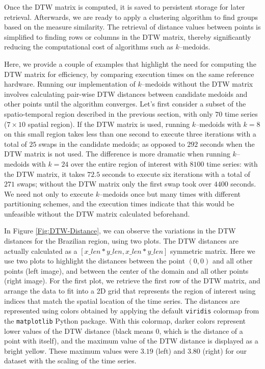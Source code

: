 Once the DTW matrix is computed, it is saved to persistent storage for later retrieval. Afterwards, we are ready to apply a clustering algorithm to find groups based on the measure similarity. The retrieval of distance values between points is simplified to finding rows or columns in the DTW matrix, thereby significantly reducing the computational cost of algorithms such as $k$--medoids.

Here, we provide a couple of examples that highlight the need for computing the DTW matrix for efficiency, by comparing execution times on the same reference hardware. Running our implementation of $k$--medoids without the DTW matrix involves calculating pair-wise DTW distances between candidate medoids and other points until the algorithm converges. Let's first consider a subset of the spatio-temporal region described in the previous section, with only $70$ time series ($7 \times 10$ spatial region). If the DTW matrix is used, running $k$--medoids with $k=8$ on this small region takes less than one second to execute three iterations with a total of $25$ swaps in the candidate medoids; as opposed to $292$ seconds when the DTW matrix is not used. The difference is more dramatic when running $k$--medoids with $k=24$ over the entire region of interest with $8100$ time series: with the DTW matrix, it  takes $72.5$ seconds to execute six iterations with a total of $271$ swaps; without the DTW matrix only the first swap took over $4400$ seconds. We need not only to execute $k$--medoids once but many times with different partitioning schemes, and the execution times indicate that this would be unfeasible without the DTW matrix calculated beforehand.

In Figure \ref{Fig:DTW-Distance}, we can observe the variations in the DTW distances for the Brazilian region, using two plots. The DTW distances are actually calculated as a $[x\_len * y\_len, x\_len * y\_len]$ symmetric matrix. Here we use two plots to highlight the distances between the point $(0, 0)$ and all other points (left image), and between the center of the domain and all other points (right image). For the first plot, we retrieve the first row of the DTW matrix, and arrange the data to fit into a 2D grid that represents the region of interest using indices that match the spatial location of the time series. The distances are represented using colors obtained by applying the default \texttt{viridis} colormap from the \texttt{matplotlib} Python package. With this colormap, darker colors represent lower values of the DTW distance (black means 0, which is the distance of a point with itself), and the maximum value of the DTW distance is displayed as a bright yellow. These maximum values were $3.19$ (left) and $3.80$ (right) for our dataset with the scaling of the time series.

